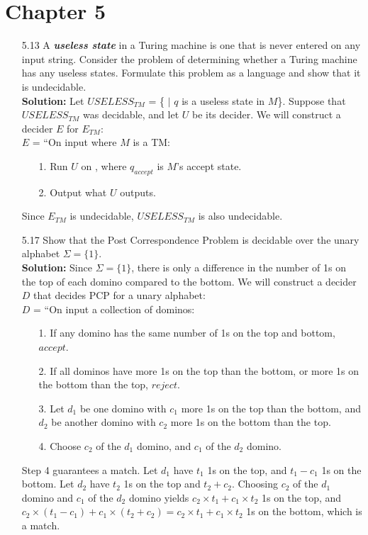 \section{Chapter 5}
\begin{enumerate}
\item[5.13]A \emph{\textbf{useless state}} in a Turing machine is one that is never entered on any input string. Consider the problem of determining whether a Turing machine has any useless states. Formulate this problem as a language and show that it is undecidable.
\\
\textbf{Solution:} Let $USELESS_{TM}$ = \{ $|$ $q$ is a useless state in $M$\}. Suppose that $USELESS_{TM}$ was decidable, and let $U$ be its decider. We will construct a decider $E$ for $E_{TM}$:
\\
$E$ = ``On input  where $M$ is a TM:
\begin{enumerate}
\itemsep0em
\item[1.]Run $U$ on , where $q_{accept}$ is $M$'s accept state.
\item[2.]Output what $U$ outputs.
\end{enumerate}
Since $E_{TM}$ is undecidable, $USELESS_{TM}$ is also undecidable.

\item[5.17]Show that the Post Correspondence Problem is decidable over the unary alphabet $\Sigma = \{1\}$.
\\
\textbf{Solution:} Since $\Sigma = \{1\}$, there is only a difference in the number of 1s on the top of each domino compared to the bottom. We will construct a decider $D$ that decides PCP for a unary alphabet:
\\
$D$ = ``On input a collection of dominos:
\begin{enumerate}
\itemsep0em
\item[1.]If any domino has the same number of 1s on the top and bottom, $accept$.
\item[2.]If all dominos have more 1s on the top than the bottom, or more 1s on the bottom than the top, $reject$.
\item[3.]Let $d_1$ be one domino with $c_1$ more 1s on the top than the bottom, and $d_2$ be another domino with $c_2$ more 1s on the bottom than the top.
\item[4.]Choose $c_2$ of the $d_1$ domino, and $c_1$ of the $d_2$ domino.
\end{enumerate}
Step 4 guarantees a match. Let $d_1$ have $t_1$ 1s on the top, and $t_1 - c_1$ 1s on the bottom. Let $d_2$ have $t_2$ 1s on the top and $t_2 + c_2$. Choosing $c_2$ of the $d_1$ domino and $c_1$ of the $d_2$ domino yields $c_2 \times t_1 + c_1 \times t_2$ 1s on the top, and $c_2 \times (t_1 - c_1) + c_1 \times (t_2 + c_2) = c_2 \times t_1 + c_1 \times t_2$ 1s on the bottom, which is a match.


\end{enumerate}
